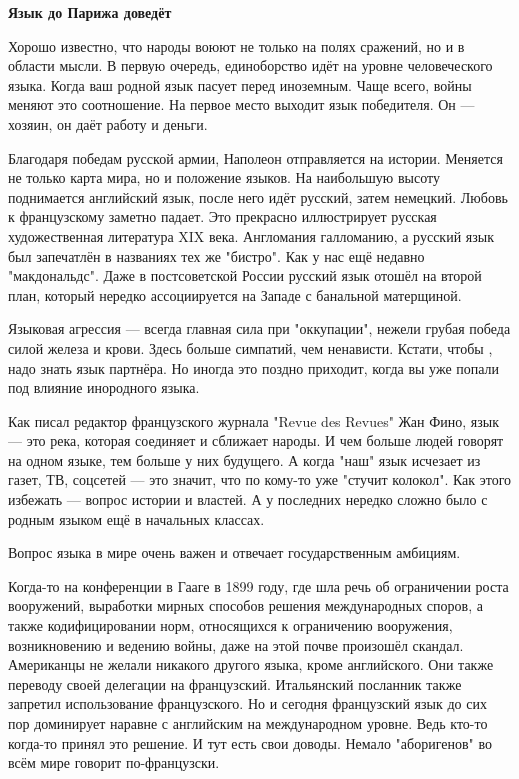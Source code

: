 \textbf{Язык до Парижа доведёт}

Хорошо известно, что народы воюют не только на полях сражений, но и в области мысли. В первую очередь, единоборство идёт на уровне человеческого языка. Когда ваш родной язык пасует перед иноземным. Чаще всего, войны меняют это соотношение. На первое место выходит язык победителя. Он --- хозяин, он даёт работу и деньги.

Благодаря победам русской армии, Наполеон отправляется на  истории. Меняется не только карта мира, но и положение языков. На наибольшую высоту поднимается английский язык, после него идёт русский, затем немецкий. Любовь к французскому заметно падает. Это прекрасно иллюстрирует русская художественная литература XIX века. Англомания  галломанию, а русский язык был запечатлён в названиях тех же "бистро". Как у нас ещё недавно "макдональдс". Даже в постсоветской России русский язык отошёл на второй план, который нередко ассоциируется на Западе с банальной матерщиной.

Языковая агрессия --- всегда главная сила при "оккупации", нежели грубая победа силой железа и крови. Здесь больше симпатий, чем ненависти. Кстати, чтобы , надо знать язык партнёра. Но иногда это поздно приходит, когда вы уже попали под влияние инородного языка.

Как писал редактор французского журнала "Revue des Revues" Жан Фино, язык --- это река, которая соединяет и сближает народы. И чем больше людей говорят на одном языке, тем больше у них будущего. А когда "наш" язык исчезает из газет, ТВ, соцсетей --- это значит, что по кому-то уже "стучит колокол". Как этого избежать --- вопрос истории и властей. А у последних нередко сложно было с родным языком ещё в начальных классах.

Вопрос  языка в мире очень важен и отвечает государственным амбициям.

Когда-то на конференции в Гааге в 1899 году, где шла речь об ограничении роста вооружений, выработки мирных способов решения международных споров, а также кодифицировании норм, относящихся к ограничению вооружения, возникновению и ведению войны, даже на этой почве произошёл скандал. Американцы не желали никакого другого языка, кроме английского. Они также  переводу своей делегации на французский. Итальянский посланник также запретил использование французского. Но и сегодня французский язык до сих пор доминирует наравне с английским на международном уровне. Ведь кто-то когда-то принял это решение. И тут есть свои доводы. Немало "аборигенов" во всём мире говорит по-французски.

